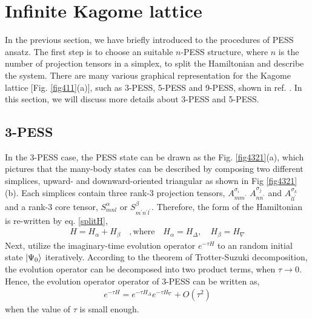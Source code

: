 \section{Infinite Kagome lattice}
\label{kagome}
In the previous section, we have briefly introduced to the procedures of PESS ansatz. The first step is to  choose an suitable $n$-PESS structure, where $n$ is the number of projection tensors in a simplex, to split the Hamiltonian and describe the system. There are many various graphical representation for the Kagome lattice [Fig. \ref{fig411}(a)], such as 3-PESS, 5-PESS and 9-PESS, shown in ref. \cite{}. In this section, we will discuss more details about 3-PESS and 5-PESS.
\subsection{3-PESS}
In the 3-PESS case, the PESS state can be drawn as the Fig. \ref{fig4321}(a), which pictures that the many-body states can be described by composing two different simplices, upward- and downward-oriented triangular as shown in Fig \ref{fig4321}(b). Each simplices contain three rank-3 projection tensors, $A^{\sigma_i}_{mm^{\prime}}$ $A^{\sigma_j}_{nn^{\prime}}$ and $A^{\sigma_k}_{ll^{\prime}}$ and a rank-3 core tensor, $S_{mnl}^{\alpha}$ or $S_{m^{\prime}n^{\prime}l^{\prime}}^{\beta}$. Therefore, the form of the Hamiltonian is re-written by eq. \ref{splitH},
\begin{align}
	H = H_{\alpha} + H_{\beta} \quad,\text{where} \quad H_{\alpha} = H_{\Delta},\quad H_{\beta} = H_{\nabla}
\end{align}
Next, utilize the imaginary-time evolution operator $e^{-\tau H}$ to an random initial state $\Ket{\Psi_{0}}$ iteratively. According to the theorem of Trotter-Suzuki decomposition, the evolution operator can be decomposed into two product terms, when $\tau \rightarrow 0$. Hence, the evolution operator operator of 3-PESS can be written as, 
\begin{align}
	\label{eq415}
	e^{-\tau H} = e^{-\tau H_{\Delta}} e^{-\tau H_{\nabla}} + O(\tau^2)
\end{align}
when the value of $\tau$ is small enough. 
\label{3pess}
